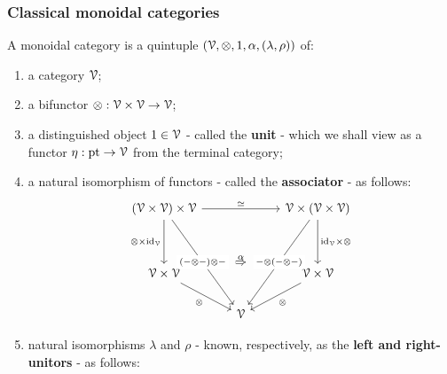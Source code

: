             \subsubsection{Classical monoidal categories}
                \begin{definition} \label{def: monoidal_categories}
                    A monoidal category is a quintuple $(\calV, \tensor, 1, \alpha, (\lambda, \rho))$ of:
                        \begin{enumerate}
                            \item a category $\mathcal{V}$;
                            \item a bifunctor $\tensor: \calV \x \calV \to \calV$;
                            \item a distinguished object $1 \in \mathcal{V}$ - called the \textbf{unit} - which we shall view as a functor $\eta: \mathrm{pt} \to \mathcal{V}$ from the terminal category;
                            \item a natural isomorphism of functors - called the \textbf{associator} - as follows:
                                $$
                                    \begin{tikzcd}
                                    	{(\calV \x \calV) \x \calV} && {\calV \x (\calV \x \calV)} \\
                                    	\\
                                    	{\calV \x \calV} && {\calV \x \calV} \\
                                    	& \calV
                                    	\arrow["{\tensor \x \id_{\calV}}"', from=1-1, to=3-1]
                                    	\arrow["\tensor"', from=3-1, to=4-2]
                                    	\arrow["\tensor", from=3-3, to=4-2]
                                    	\arrow["{\id_{\calV} \x \tensor }", from=1-3, to=3-3]
                                    	\arrow["\cong", from=1-1, to=1-3]
                                    	\arrow[""{name=0, anchor=center, inner sep=0}, "{(- \tensor -) \tensor -}"{description}, from=1-1, to=4-2]
                                    	\arrow[""{name=1, anchor=center, inner sep=0}, "{- \tensor (- \tensor -)}"{description}, from=1-3, to=4-2]
                                    	\arrow["\alpha", shorten <=26pt, shorten >=26pt, Rightarrow, from=0, to=1]
                                    \end{tikzcd}
                                $$
                            \item natural isomorphisms $\lambda$ and $\rho$ - known, respectively, as the \textbf{left and right-unitors} - as follows:

\end{enumerate}
\end{definition}

